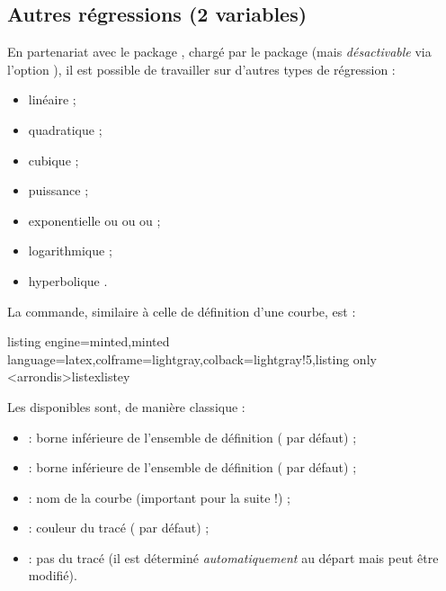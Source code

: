 \documentclass[11pt,a4paper]{ltxdoc}
\begin{document}
\subsection{Autres régressions (2 variables)}\label{regressions}

En partenariat avec le package , chargé par le package (mais \textit{désactivable} via l'option \MontreCode{[nonxintreg]}), il est possible de travailler sur d'autres types de régression :

\begin{itemize}
  \item linéaire  ;
  \item quadratique  ;
  \item cubique  ;
  \item puissance  ;
  \item exponentielle  ou  ou  ou  ;
  \item logarithmique  ;
  \item hyperbolique .
\end{itemize}

La commande, similaire à celle de définition d'une courbe, est :

\begin{tcblisting}{listing engine=minted,minted language=latex,colframe=lightgray,colback=lightgray!5,listing only}
<arrondis>{listex}{listey}
\end{tcblisting}

Les \MontreCode{[clés]} disponibles sont, de manière classique :

\begin{itemize}
  \item {} : borne inférieure de l'ensemble de définition ( par défaut) ;
  \item {} : borne inférieure de l'ensemble de définition ( par défaut) ;
  \item {} : nom de la courbe (important pour la suite !) ;
  \item {} : couleur du tracé ( par défaut) ;
  \item {} : pas du tracé (il est déterminé \textit{automatiquement} au départ mais peut être modifié).
\end{itemize}
\end{document}
